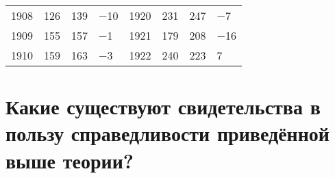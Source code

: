 \documentclass[leqno]{article}  %
\begin{document}
\begin{table}
{\begin{tabular}{p{}|p{}|p{}|p{}||p{}|p{}|p{}|p{}}
1908 & \hfill 126 & \hfill 139 & \hfill \(-\)10 \hspace*{4mm} & 1920 & \hfill 231 & \hfill 247 & \hfill \(-\)7 \hspace*{4mm} \\
1909 & \hfill 155 & \hfill 157 & \hfill \(-\)1 \hspace*{4mm} & 1921 & \hfill 179 & \hfill 208 & \hfill \(-\)16 \hspace*{4mm} \\
1910 & \hfill 159 & \hfill 163 & \hfill \(-\)3 \hspace*{4mm} & 1922 & \hfill 240 & \hfill 223 & \hfill 7 \hspace*{4mm} \\
\hline
\end{tabular}
}
\end{table}


\section{Какие существуют свидетельства в пользу справедливости приведённой выше теории?}
\end{document}
